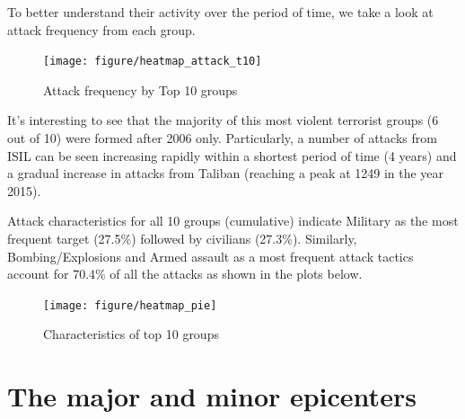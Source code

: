 \documentclass[11pt,oneside,a4paper]{reedthesis}
\newenvironment{Shaded}{\begin{snugshade}}{\end{snugshade}}
\newcommand{\KeywordTok}[1]{\textcolor[rgb]{0.13,0.29,0.53}{\textbf{#1}}}
\newcommand{\DataTypeTok}[1]{\textcolor[rgb]{0.13,0.29,0.53}{#1}}
\newcommand{\StringTok}[1]{\textcolor[rgb]{0.31,0.60,0.02}{#1}}
\newcommand{\OperatorTok}[1]{\textcolor[rgb]{0.81,0.36,0.00}{\textbf{#1}}}
\newcommand{\NormalTok}[1]{#1}
\begin{document}
To better understand their activity over the period of time, we take a
look at attack frequency from each group.
\begin{Shaded}
\end{Shaded}
\begin{figure}
\texttt{[image: figure/heatmap\_attack\_t10]} \caption{Attack frequency by Top 10 groups}\label{fig:unnamed-chunk-13}
\end{figure}
It's interesting to see that the majority of this most violent terrorist
groups (6 out of 10) were formed after 2006 only. Particularly, a number
of attacks from ISIL can be seen increasing rapidly within a shortest
period of time (4 years) and a gradual increase in attacks from Taliban
(reaching a peak at 1249 in the year 2015).

Attack characteristics for all 10 groups (cumulative) indicate Military
as the most frequent target (27.5\%) followed by civilians (27.3\%).
Similarly, Bombing/Explosions and Armed assault as a most frequent
attack tactics account for 70.4\% of all the attacks as shown in the
plots below.
\begin{figure}
\texttt{[image: figure/heatmap\_pie]} \caption{Characteristics of top 10 groups}\label{fig:unnamed-chunk-14}
\end{figure}
\section{The major and minor
epicenters}\label{the-major-and-minor-epicenters}
\end{document}
